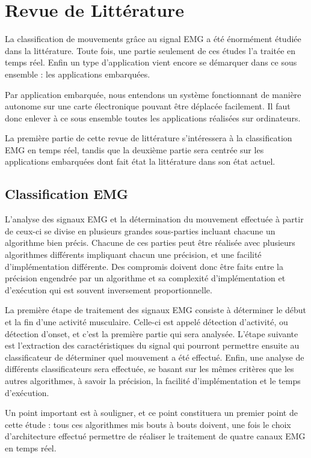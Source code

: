 \documentclass[letterpaper, twoside, 12pt, memoire, creativecommons, hyperref]{thETS}
\begin{document}
\chapter{Revue de Littérature}

La classification de mouvements grâce au signal EMG a été énormément étudiée dans la littérature. Toute fois, une partie seulement de ces études l'a traitée en temps réel. Enfin un type d'application vient encore se démarquer dans ce sous ensemble : les applications embarquées. 

Par application embarquée, nous entendons un système fonctionnant de manière autonome sur une carte électronique pouvant être déplacée facilement. Il faut donc enlever à ce sous ensemble toutes les applications réalisées sur ordinateurs. 

La première partie de cette revue de littérature s’intéressera à la classification EMG en temps réel, tandis que la deuxième partie sera centrée sur les applications embarquées dont fait état la littérature dans son état actuel.

\section{Classification EMG}

L’analyse des signaux EMG et la détermination du mouvement effectuée à partir de ceux-ci se divise en plusieurs grandes sous-parties incluant chacune un algorithme bien précis. Chacune de ces parties peut être réalisée avec plusieurs algorithmes différents impliquant chacun une précision, et une facilité d’implémentation différente. Des compromis doivent donc être faits entre la précision engendrée par un algorithme et sa complexité d’implémentation et d’exécution qui est souvent inversement proportionnelle. 

La première étape de traitement des signaux EMG consiste à déterminer le début et la fin d'une activité musculaire. Celle-ci est appelé détection d’activité, ou détection d'onset, et c’est la première partie qui sera analysée. L’étape suivante est l’extraction des caractéristiques du signal qui pourront permettre ensuite au classificateur de déterminer quel mouvement a été effectué. Enfin, une analyse de différents classificateurs sera effectuée, se basant sur les mêmes critères que les autres algorithmes, à savoir la précision, la facilité d’implémentation et le temps d’exécution. 

Un point important est à souligner, et ce point constituera un premier point de cette étude : tous ces algorithmes mis bouts à bouts doivent, une fois le choix d’architecture effectué permettre de réaliser le traitement de quatre canaux EMG en temps réel.
\end{document}
